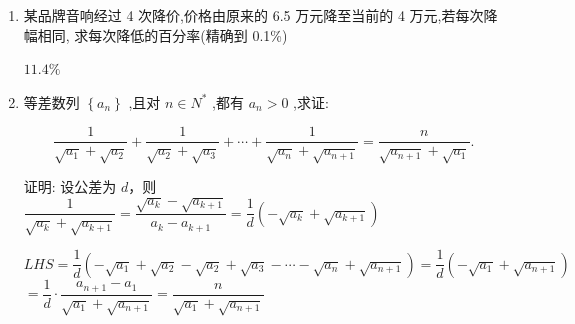 \begin{enumerate}
    \item 某品牌音响经过 4 次降价,价格由原来的 6.5 万元降至当前的 4 万元,若每次降幅相同, 求每次降低的百分率(精确到 0.1\%)
    \begin{jieda}
        $11.4\%$
    \end{jieda}

    \item 等差数列 $\left\{  {a}_{n}\right\}$ ,且对 $n \in  {N}^{ * }$ ,都有 ${a}_{n} > 0$ ,求证:

    \[
    \dfrac{1}{\sqrt{{a}_{1}} + \sqrt{{a}_{2}}} + \dfrac{1}{\sqrt{{a}_{2}} + \sqrt{{a}_{3}}} + \cdots  + \dfrac{1}{\sqrt{{a}_{n}} + \sqrt{{a}_{n + 1}}} = \dfrac{n}{\sqrt{{a}_{n + 1}} + \sqrt{{a}_{1}}}.
    \]
    \begin{jieda}
        证明: 设公差为 $d$，则 $\dfrac{1}{\sqrt{{a}_{k}} + \sqrt{{a}_{k + 1}}} = \dfrac{\sqrt{{a}_{k}} - \sqrt{{a}_{k + 1}}}{{a}_{k} - {a}_{k + 1}} = \dfrac{1}{d}\left( {-\sqrt{{a}_{k}} + \sqrt{{a}_{k + 1}}}\right)$
        
        $LHS = \dfrac{1}{d}\left( {-\sqrt{{a}_{1}} + \sqrt{{a}_{2}} - \sqrt{{a}_{2}} + \sqrt{{a}_{3}} - \cdots  - \sqrt{{a}_{n}} + \sqrt{{a}_{n + 1}}}\right)  = \dfrac{1}{d}\left( {-\sqrt{{a}_{1}} + \sqrt{{a}_{n + 1}}}\right)$
        $= \dfrac{1}{d} \cdot  \dfrac{{a}_{n + 1} - {a}_{1}}{\sqrt{{a}_{1}} + \sqrt{{a}_{n + 1}}} = \dfrac{n}{\sqrt{{a}_{1}} + \sqrt{{a}_{n + 1}}}$
    \end{jieda}

    
\end{enumerate}

